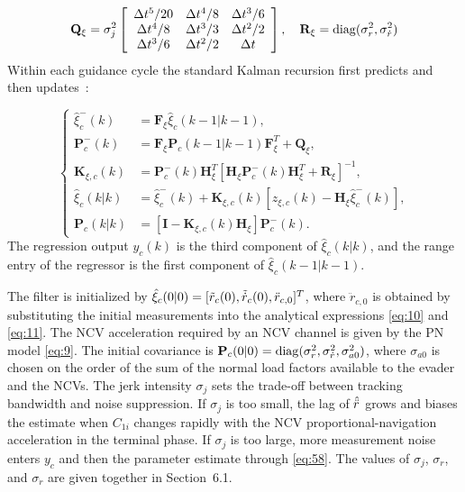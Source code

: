 \begin{equation}
\label{eq:62d}
{{\mathbf{Q}}_\xi } = \sigma _j^2\left[ {\begin{array}{*{20}{c}}
  {\Delta {t^5}/20}&{\Delta {t^4}/8}&{\Delta {t^3}/6} \\ 
  {\Delta {t^4}/8}&{\Delta {t^3}/3}&{\Delta {t^2}/2} \\ 
  {\Delta {t^3}/6}&{\Delta {t^2}/2}&{\Delta t} 
\end{array}} \right],\quad {{\mathbf{R}}_\xi } = \diag(\sigma _r^2,\sigma _{\dot r}^2)
\end{equation}
Within each guidance cycle the standard Kalman recursion first predicts and then updates~\cite{barshalom2001}:

\begin{equation}
\label{eq:62e}
\left\{
\begin{aligned}
\hat \xi _c^-(k) &= {{\mathbf{F}}_\xi }{{\hat \xi }_c}(k - 1|k - 1),\\
{\mathbf{P}}_c^-(k) &= {{\mathbf{F}}_\xi }{{\mathbf{P}}_c}(k - 1|k - 1){\mathbf{F}}_\xi ^T + {{\mathbf{Q}}_\xi },\\
{{\mathbf{K}}_{\xi ,c}}(k) &= {\mathbf{P}}_c^-(k){\mathbf{H}}_\xi ^T
\left[ {\mathbf{H}}_\xi {\mathbf{P}}_c^-(k){\mathbf{H}}_\xi ^T + {\mathbf{R}}_\xi \right]^{-1},\\
{{\hat \xi }_c}(k|k) &= \hat \xi _c^-(k)+{{\mathbf{K}}_{\xi ,c}}(k)
\left[ {z_{\xi ,c}}(k)-{{\mathbf{H}}_\xi }\hat \xi _c^-(k) \right],\\
{{\mathbf{P}}_c}(k|k) &= \left[ {\mathbf{I}}-{{\mathbf{K}}_{\xi ,c}}(k){{\mathbf{H}}_\xi } \right]{\mathbf{P}}_c^-(k).
\end{aligned}
\right.
\end{equation}
The regression output ${y_c}(k)$ is the third component of ${\hat \xi _c}(k|k)$, and the range entry of the regressor is the first component of ${\hat \xi _c}(k - 1|k - 1)$.

The filter is initialized by ${\hat \xi _c}(0|0) = {[\tilde{r}_{c}(0),\tilde{\dot{r}}_{c}(0),{{\ddot r}_{c,0}}]^T}$, where ${\ddot r_{c,0}}$ is obtained by substituting the initial measurements into the analytical expressions \eqref{eq:10} and \eqref{eq:11}. The NCV acceleration required by an NCV channel is given by the PN model \eqref{eq:9}. The initial covariance is ${{\mathbf{P}}_c}(0|0) = \operatorname{diag}(\sigma _r^2,\sigma _{\dot r}^2,\sigma _{a0}^2)$, where ${\sigma _{a0}}$ is chosen on the order of the sum of the normal load factors available to the evader and the NCVs. The jerk intensity ${\sigma _j}$ sets the trade-off between tracking bandwidth and noise suppression. If ${\sigma _j}$ is too small, the lag of $\hat{\ddot{r}}$ grows and biases the estimate when ${C_{1i}}$ changes rapidly with the NCV proportional-navigation acceleration in the terminal phase. If ${\sigma _j}$ is too large, more measurement noise enters ${y_c}$ and then the parameter estimate through \eqref{eq:58}. The values of ${\sigma _j}$, ${\sigma _r}$, and ${\sigma _{\dot r}}$ are given together in Section~6.1.

